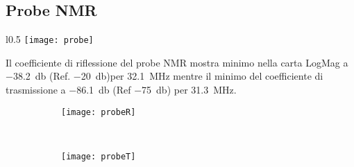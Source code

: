 \documentclass[main.tex]{subfiles}
\begin{document}
\subsection{Probe NMR}
\begin{wrapfigure}[10]{l}{0.5\textwidth} \texttt{[image: probe]} \end{wrapfigure}

Il coefficiente di riflessione del probe NMR mostra minimo  nella carta LogMag a \SI{-38.2}{\decibel} (Ref. \SI{-20}{\decibel})per \SI{32.1}{\mega\hertz} mentre il minimo del coefficiente di trasmissione a \SI{-86.1}{\decibel} (Ref \SI{-75}{\decibel}) per \SI{31.3}{\mega\hertz}.

\begin{figure}[!ht] \begin{subfigure}[b]{0.47\textwidth} \centering \texttt{[image: probeR]}\label{fig:probeR} \end{subfigure} ~ \begin{subfigure}[b]{0.47\textwidth} \centering \texttt{[image: probeT]}\label{fig:probeT}
\end{subfigure} \end{figure} 



\end{document}
